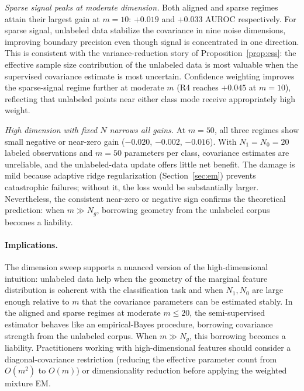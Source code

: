 \documentclass[11pt]{article}
\theoremstyle{definition}
\begin{document}
\emph{Sparse signal peaks at moderate dimension.}
Both aligned and sparse regimes attain their largest gain at \(m=10\):
\(+0.019\) and \(+0.033\) AUROC respectively.
For sparse signal, unlabeled data stabilize the covariance in nine noise
dimensions, improving boundary precision even though signal is concentrated
in one direction.
This is consistent with the variance-reduction story of
Proposition~\ref{prop:ess}: the effective sample size contribution of
the unlabeled data is most valuable when the supervised covariance
estimate is most uncertain.
Confidence weighting improves the sparse-signal regime further at
moderate \(m\) (R4 reaches \(+0.045\) at \(m=10\)), reflecting that
unlabeled points near either class mode receive appropriately high weight.

\emph{High dimension with fixed \(N\) narrows all gains.}
At \(m=50\), all three regimes show small negative or near-zero gain
(\(-0.020\), \(-0.002\), \(-0.016\)).
With \(N_1=N_0=20\) labeled observations and \(m=50\) parameters per class,
covariance estimates are unreliable, and the unlabeled-data update
offers little net benefit.
The damage is mild because adaptive ridge regularization
(Section~\ref{sec:em}) prevents catastrophic failures; without it, the
loss would be substantially larger.
Nevertheless, the consistent near-zero or negative sign confirms
the theoretical prediction: when \(m\gg N_g\), borrowing geometry
from the unlabeled corpus becomes a liability.

\paragraph{Implications.}
The dimension sweep supports a nuanced version of the high-dimensional
intuition:
unlabeled data help when the geometry of the marginal feature
distribution is coherent with the classification task and when
\(N_1,N_0\) are large enough relative to \(m\) that the covariance
parameters can be estimated stably.
In the aligned and sparse regimes at moderate \(m\leq 20\), the
semi-supervised estimator behaves like an empirical-Bayes procedure,
borrowing covariance strength from the unlabeled corpus.
When \(m\gg N_g\), this borrowing becomes a liability.
Practitioners working with high-dimensional features should consider
a diagonal-covariance restriction (reducing the effective parameter count
from \(O(m^2)\) to \(O(m)\)) or dimensionality reduction before applying
the weighted mixture EM.
\end{document}
